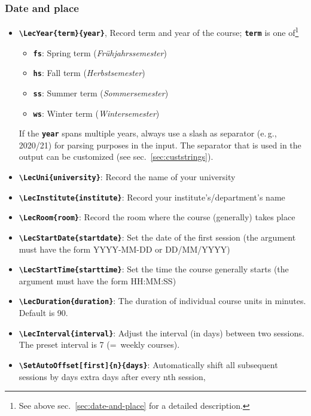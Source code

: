 \documentclass[english]{article}
\newcommand*\jmacro[1]{\textbf{\texttt{#1}}}
\newcommand*\jcsmacro[1]{\jmacro{\textbackslash{#1}}}
\newcommand*\joption[1]{\textbf{\texttt{#1}}}
\newcommand*\jparam[1]{\angus #1\angud}
\begin{document}
\subsubsection{Date and place}
\begin{itemize}
\item \jcsmacro{LecYear\{\jparam{term}\}\{\jparam{year}\}}, Record term and
year of the course; \joption{\jparam{term}} is one of\footnote{See above sec.~\ref{sec:date-and-place} for a detailed
description.}

\begin{itemize}
\item \joption{fs}: Spring term (\emph{Frühjahrssemester})
\item \joption{hs}: Fall term (\emph{Herbstsemester})
\item \joption{ss}: Summer term (\emph{Sommersemester})
\item \joption{ws}: Winter term (\emph{Wintersemester})
\end{itemize}
%
If the \joption{\jparam{year}} spans multiple years, always use a slash as separator (e.\,g., 2020/21)
for parsing purposes in the input.
The separator that is used in the output can be customized (see sec.~\ref{sec:custstrings}).
\item \jcsmacro{LecUni\{\jparam{university}\}}: Record the name of
your university
\item \jcsmacro{LecInstitute\{\jparam{institute}\}}: Record your institute's/department's name
\item \jcsmacro{LecRoom\{\jparam{room}\}}: Record the room where the course (generally) takes place
\item \jcsmacro{LecStartDate\{\jparam{startdate}\}}: Set the date of
       the first session (the argument must have the form YYYY-MM-DD or DD/MM/YYYY)
\item \jcsmacro{LecStartTime\{\jparam{starttime}\}}: Set the time the course generally starts
      (the argument must have the form HH:MM:SS)
\item \jcsmacro{LecDuration\{\jparam{duration}\}}: The duration of individual course units in minutes.
      Default is 90.
\item \jcsmacro{LecInterval\{\jparam{interval}\}}: Adjust the interval (in days) between two sessions.
      The preset interval is 7 (=~weekly courses).
\item \jcsmacro{SetAutoOffset[\jparam{first}]\{\jparam{n}\}\{\jparam{days}\}}:
      Automatically shift all subsequent sessions
      by \jparam{days} extra days after every \jparam{n}th session,

\end{itemize}
\end{document}
